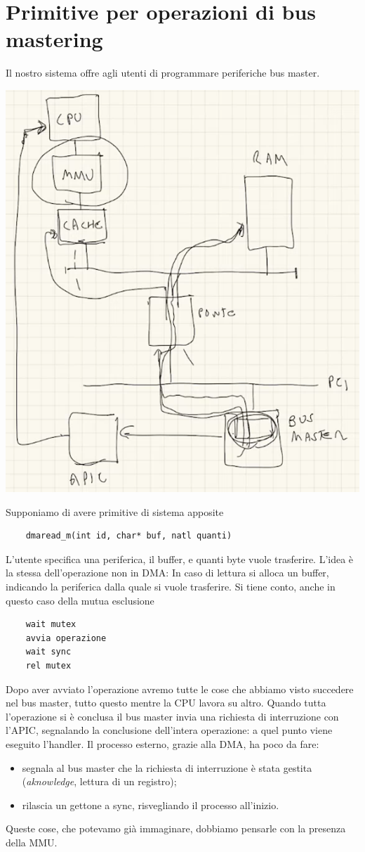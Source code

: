 \section{Primitive per operazioni di bus mastering}
Il nostro sistema offre agli utenti di programmare periferiche bus master. 
\begin{center}
	\includegraphics[scale=.6]{img/282.PNG}
\end{center}
Supponiamo di avere primitive di sistema apposite
\begin{verbatim}
	dmaread_m(int id, char* buf, natl quanti)
\end{verbatim}
L'utente specifica una periferica, il buffer, e quanti byte vuole trasferire. L'idea è la stessa dell'operazione non in DMA: In caso di lettura si alloca un buffer, indicando la periferica dalla quale si vuole trasferire. Si tiene conto, anche in questo caso della mutua esclusione
\begin{verbatim}
	wait mutex
	avvia operazione
	wait sync
	rel mutex
\end{verbatim}
Dopo aver avviato l'operazione avremo tutte le cose che abbiamo visto succedere nel bus master, tutto questo mentre la CPU lavora su altro. Quando tutta l'operazione si è conclusa il bus master invia una richiesta di interruzione con l'APIC, segnalando la conclusione dell'intera operazione: a quel punto viene eseguito l'handler. Il processo esterno, grazie alla DMA, ha poco da fare:
\begin{itemize}
	\item segnala al bus master che la richiesta di interruzione è stata gestita (\emph{aknowledge}, lettura di un registro);
	\item rilascia un gettone a sync, risvegliando il processo all'inizio.
\end{itemize}
Queste cose, che potevamo già immaginare, dobbiamo pensarle con la presenza della MMU. 
